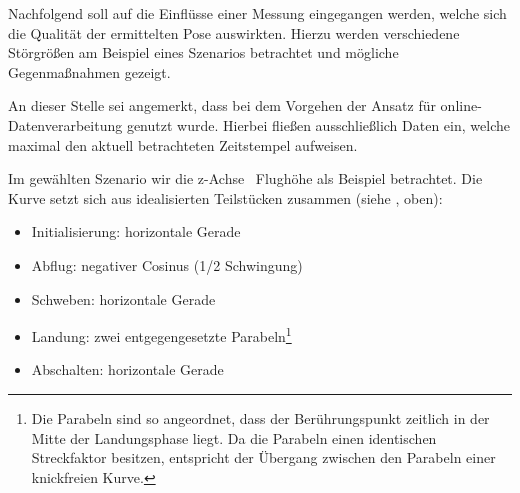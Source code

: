 











Nachfolgend soll auf die Einflüsse einer Messung eingegangen werden, welche sich die Qualität der ermittelten Pose auswirkten. Hierzu werden verschiedene Störgrößen am Beispiel eines Szenarios betrachtet und mögliche Gegenmaßnahmen gezeigt.

An dieser Stelle sei angemerkt, dass bei dem Vorgehen der Ansatz für online-Datenverarbeitung genutzt wurde. Hierbei fließen ausschließlich Daten ein, welche maximal den aktuell betrachteten Zeitstempel aufweisen.


Im gewählten Szenario wir die z-Achse \bzw\ Flughöhe als Beispiel betrachtet. 
Die Kurve setzt sich aus idealisierten Teilstücken zusammen (siehe , oben):
\begin{itemize}
\item Initialisierung: horizontale Gerade
\item Abflug: negativer Cosinus (1/2 Schwingung)
\item Schweben: horizontale Gerade
\item Landung: zwei entgegengesetzte Parabeln\footnote{Die Parabeln sind so angeordnet, dass der Berührungspunkt zeitlich in der Mitte der Landungsphase liegt. Da die Parabeln einen identischen Streckfaktor besitzen, entspricht der Übergang zwischen den Parabeln einer knickfreien Kurve.}
\item Abschalten: horizontale Gerade
\end{itemize}


